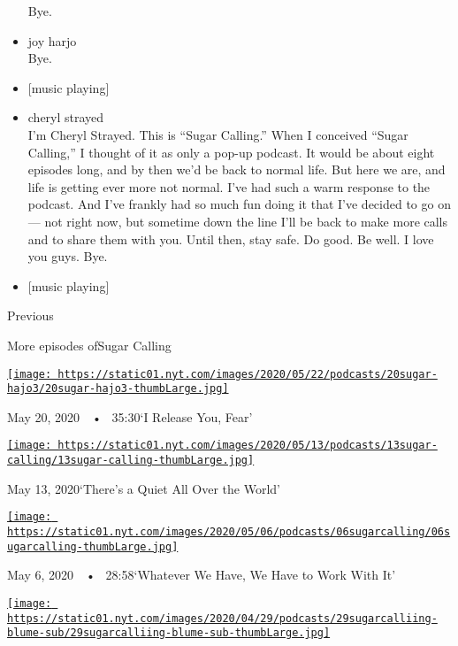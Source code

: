 \begin{itemize}
  Bye.
\item
  joy harjo\\
  Bye.
\item
  {[}music playing{]}
\item
  cheryl strayed\\
  I'm Cheryl Strayed. This is ``Sugar Calling.'' When I conceived
  ``Sugar Calling,'' I thought of it as only a pop-up podcast. It would
  be about eight episodes long, and by then we'd be back to normal life.
  But here we are, and life is getting ever more not normal. I've had
  such a warm response to the podcast. And I've frankly had so much fun
  doing it that I've decided to go on --- not right now, but sometime
  down the line I'll be back to make more calls and to share them with
  you. Until then, stay safe. Do good. Be well. I love you guys. Bye.
\item
  {[}music playing{]}
\end{itemize}

Previous

More episodes ofSugar Calling

\href{https://www.nytimes.com/2020/05/20/podcasts/sugar-calling-joy-harjo-poetry-virus.html?action=click\&module=audio-series-bar\&region=header\&pgtype=Article}{\texttt{[image: https://static01.nyt.com/images/2020/05/22/podcasts/20sugar-hajo3/20sugar-hajo3-thumbLarge.jpg]}}

May 20, 2020~~•~ 35:30`I Release You, Fear'

\href{https://www.nytimes.com/2020/05/13/podcasts/sugar-calling-billy-collins-poetry-virus.html?action=click\&module=audio-series-bar\&region=header\&pgtype=Article}{\texttt{[image: https://static01.nyt.com/images/2020/05/13/podcasts/13sugar-calling/13sugar-calling-thumbLarge.jpg]}}

May 13, 2020`There's a Quiet All Over the World'

\href{https://www.nytimes.com/2020/05/06/podcasts/sugar-calling-alice-walker-quarantine-virus.html?action=click\&module=audio-series-bar\&region=header\&pgtype=Article}{\texttt{[image: https://static01.nyt.com/images/2020/05/06/podcasts/06sugarcalling/06sugarcalling-thumbLarge.jpg]}}

May 6, 2020~~•~ 28:58`Whatever We Have, We Have to Work With It'

\href{https://www.nytimes.com/2020/04/29/podcasts/sugar-calling-judy-blume-quarantine-virus.html?action=click\&module=audio-series-bar\&region=header\&pgtype=Article}{\texttt{[image: https://static01.nyt.com/images/2020/04/29/podcasts/29sugarcalliing-blume-sub/29sugarcalliing-blume-sub-thumbLarge.jpg]}}

